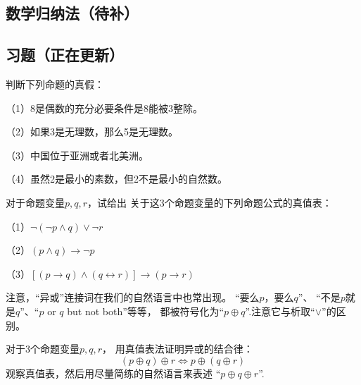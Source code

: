 \subsection{数学归纳法（待补）}
\subsection{习题（正在更新）}

\begin{prob}判断下列命题的真假：

（1）8是偶数的充分必要条件是8能被$3$整除。

（2）如果3是无理数，那么5是无理数。

（3）中国位于亚洲或者北美洲。

（4）虽然2是最小的素数，但2不是最小的自然数。

\end{prob}\vs

\begin{prob}对于命题变量$p,q,r$，试给出
关于这3个命题变量的下列命题公式的真值表：

（1）$\neg(\neg p\wedge q)\vee\neg r$

（2）$(p\wedge q)\rightarrow\neg p$

（3）$[(p\rightarrow q)\wedge(q\leftrightarrow r)]
\rightarrow(p\rightarrow r)$
\end{prob}\vs


注意，“异或”连接词在我们的自然语言中也常出现。
“要么$p$，要么$q$”、
“不是$p$就是$q$”、“$p$ or $q$ but not both”等等，
都被符号化为“$p\oplus q$”.注意它与析取“$\vee$”的区别。\vs

\begin{prob}[异或的结合律]对于3个命题变量$p,q,r$，
用真值表法证明异或的结合律：
$$(p\oplus q)\oplus r\Leftrightarrow 
p\oplus(q\oplus r)$$
观察真值表，然后用尽量简练的自然语言来表述
“$p\oplus q\oplus r$”.
\end{prob}\vs

